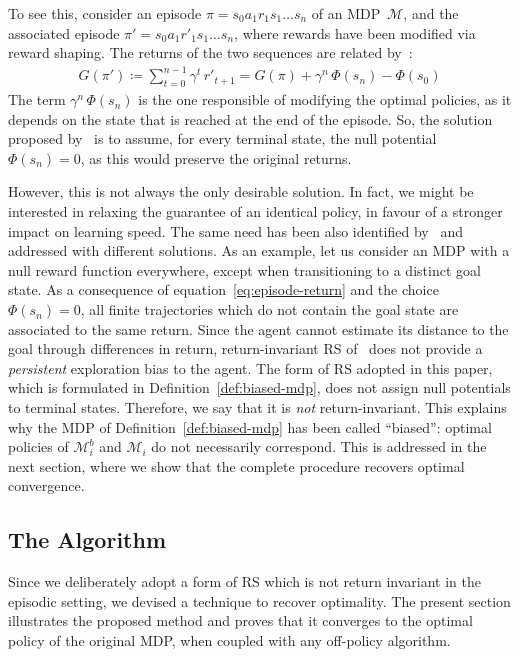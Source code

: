 \documentclass[letterpaper]{article} %
\theoremstyle{plain}
\theoremstyle{definition}
\theoremstyle{remark}
\newcommand{\SetSym}[1]{\mathcal{#1}}
\newcommand{\Trace}{\pi}
\newcommand{\Model}{\SetSym{M}}
\newcommand{\Potential}{\Phi}
\newcommand{\Biased}[1]{#1^{b}}
\newcommand{\ReturnSym}{G}
\begin{document}
To see this, consider an episode $\Trace = s_0 a_1 r_1 s_1 \dots s_n$ of an
MDP~$\Model$, and the associated episode $\Trace' = s_0 a_1 r'_1 s_1 \dots s_n$, where
rewards have been modified via reward shaping. The returns of the two sequences
are related by~\cite{grzes2017reward}:
\begin{align}
	\ReturnSym(\Trace') \coloneqq \sum_{t=0}^{n-1} \gamma^t\, r'_{t+1} = \ReturnSym(\Trace) + \gamma^n\, \Potential(s_n) - \Potential(s_0)
	\label{eq:episode-return}
\end{align}
The term $\gamma^n\, \Potential(s_n)$ is the one responsible of modifying the optimal policies, as it depends on the state that is reached at the end of the episode.
So, the solution proposed by~\cite{grzes2017reward} is to assume, for every terminal state, the null potential
${\Potential(s_n) = 0}$, as this would preserve the original returns.

However, this is not always the only desirable solution.
In fact, we might be interested in relaxing the guarantee of an identical policy, in favour of a stronger impact on learning speed.
The same need has been also identified by~\cite{schubert_2021_PlanbasedRelaxed} and addressed with different solutions.
%
As an example, let us consider an MDP with a null reward function everywhere, except when transitioning to a distinct goal state.
As a consequence of equation~\eqref{eq:episode-return} and the choice $\Potential(s_n) = 0$, all finite trajectories which do not contain the goal state are associated to the same return.
Since the agent cannot estimate its distance to the goal through differences in return, return-invariant RS of~\cite{grzes2017reward} does not provide a \emph{persistent} exploration bias to the agent.
%
The form of RS adopted in this paper, which is formulated in Definition~\ref{def:biased-mdp}, does not assign null potentials to terminal states.
Therefore, we say that it is \emph{not} return-invariant.
This explains why the MDP of Definition~\ref{def:biased-mdp} has been called \mbox{``biased''}:
optimal policies of $\Biased{\Model}_i$ and $\Model_i$ do not necessarily correspond.
This is addressed in the next section, where we show that the complete procedure recovers optimal convergence.


\subsection{The Algorithm}
\label{sec:algorithm}

Since we deliberately adopt a form of RS which is not return invariant in the episodic setting, we devised a technique to recover optimality.
The present section illustrates the proposed method and proves that it converges to the optimal policy of the original MDP, when coupled with any off-policy algorithm.
\end{document}
